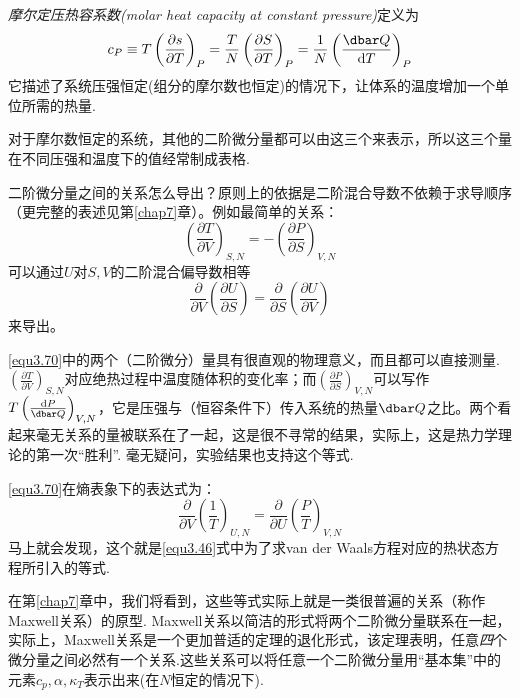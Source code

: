 {\it 摩尔定压热容系数(molar heat capacity at constant pressure)}定义为
\begin{equation}
\label{equ3.69}
c_P \equiv T\left(\frac{\partial s}{\partial T}\right)_P=\frac{T}{N}\left(\frac{\partial S}{\partial T}\right)_P=\frac{1}{N}\left(\frac{\dbar Q}{\text{d}T}\right)_P
\end{equation}
它描述了系统压强恒定(组分的摩尔数也恒定)的情况下，让体系的温度增加一个单位所需的热量.

对于摩尔数恒定的系统，其他的二阶微分量都可以由这三个来表示，所以这三个量在不同压强和温度下的值经常制成表格.

二阶微分量之间的关系怎么导出？原则上的依据是二阶混合导数不依赖于求导顺序（更完整的表述见第\ref{chap7}章）。例如最简单的关系：
\begin{equation}
\label{equ3.70}
\left(\frac{\partial T}{\partial V}\right)_{S,N}=-\left(\frac{\partial P}{\partial S}\right)_{V,N}
\end{equation}
可以通过$U$对$S,V$的二阶混合偏导数相等
\begin{equation}
\label{equ3.71}
\frac{\partial}{\partial V}\left(\frac{\partial U}{\partial S}\right)=\frac{\partial}{\partial S}\left(\frac{\partial U}{\partial V}\right)
\end{equation}
来导出。

\eqref{equ3.70}中的两个（二阶微分）量具有很直观的物理意义，而且都可以直接测量. $\left(\frac{\partial T}{\partial V}\right)_{S, N}$对应绝热过程中温度随体积的变化率；而$\left(\frac{\partial P}{\partial S}\right)_{V,N}$可以写作$T\left(\frac{\text{d} P}{\dbar Q}\right)_{V,N}$，它是压强与（恒容条件下）传入系统的热量$\dbar Q$之比。两个看起来毫无关系的量被联系在了一起，这是很不寻常的结果，实际上，这是热力学理论的第一次“胜利”. 毫无疑问，实验结果也支持这个等式.

\eqref{equ3.70}在熵表象下的表达式为：
\begin{equation}
\label{equ3.72}
\frac{\partial }{\partial V}\left(\frac{1}{T}\right)_{U,N}=\frac{\partial }{\partial U}\left(\frac{P}{T}\right)_{V,N}
\end{equation}
马上就会发现，这个就是\eqref{equ3.46}式中为了求van der Waals方程对应的热状态方程所引入的等式.

在第\ref{chap7}章中，我们将看到，这些等式实际上就是一类很普遍的关系（称作Maxwell关系）的原型. Maxwell关系以简洁的形式将两个二阶微分量联系在一起，实际上，Maxwell关系是一个更加普适的定理的退化形式，该定理表明，任意{\it 四}个微分量之间必然有一个关系.这些关系可以将任意一个二阶微分量用“基本集”中的元素$c_p,\alpha,\kappa_T$表示出来(在$N$恒定的情况下).

